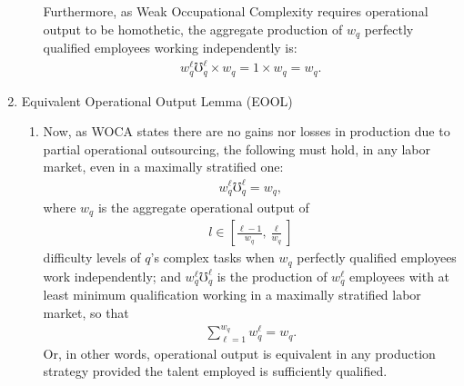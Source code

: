 \documentclass[hidelinks, nonatbib]{elsarticle}
\begin{document}
\begin{enumerate}
\begin{enumerate}
        Furthermore, as Weak Occupational Complexity requires operational output to be homothetic, the aggregate production of $w_q$ perfectly qualified employees working independently is:
        \begin{gather}
            w_{q}^{\ell}
            \mho_{q}^{\ell}
            \times
            w_q
            =
            1
            \times
            w_q
            =
            w_q
            .
        \end{gather}
    \end{enumerate}
    \item Equivalent Operational Output Lemma (EOOL)
    \begin{enumerate}
        \item Now, as WOCA states there are no gains nor losses in production due to partial operational outsourcing, the following must hold, in any labor market, even in a maximally stratified one:
        \begin{gather}
            w_{q}^{\ell}
            \mho_{q}^{\ell}
            =
            w_q
            ,
        \end{gather}
        where $w_q$ is the aggregate operational output of 
        \begin{gather}
            l \in \left[
            \frac{\ell - 1}{w_q}
            ,
            \frac{\ell}{w_q}
        \right]
        \end{gather}
        difficulty levels of $q$'s complex tasks when $w_q$ perfectly qualified employees work independently; and $w_{q}^{\ell}\mho_{q}^{\ell}$ is the production of $w_{q}^{\ell}$ employees with at least minimum qualification working in a maximally stratified labor market, so that
        \begin{gather}
            \sum_{\ell=1}^{w_q}
            w_{q}^{\ell}
            =
            w_q
            .
        \end{gather}
        Or, in other words, operational output is equivalent in any production strategy provided the talent employed is sufficiently qualified.


\end{enumerate}
\end{enumerate}
\end{document}
